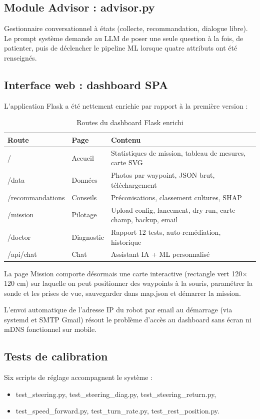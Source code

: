 \documentclass[a4paper,12pt,openany,titlepage]{scrartcl}
\begin{document}
\subsection{Module Advisor : advisor.py}
Gestionnaire conversationnel à états (collecte, recommandation, dialogue libre). Le prompt système demande au LLM de poser une seule question à la fois, de patienter, puis de déclencher le pipeline ML lorsque quatre attributs ont été renseignés.

\subsection{Interface web : dashboard SPA}
L’application Flask a été nettement enrichie par rapport à la première version :

\begin{table}[H]
\centering
\begin{tabular}{|l|l|p{7cm}|}
\hline
\textbf{Route} & \textbf{Page} & \textbf{Contenu} \\
\hline
/ & Accueil & Statistiques de mission, tableau de mesures, carte SVG \\
/data & Données & Photos par waypoint, JSON brut, téléchargement \\
/recommandations & Conseils & Préconisations, classement cultures, SHAP \\
/mission & Pilotage & Upload config, lancement, dry‑run, carte champ, backup, email \\
/doctor & Diagnostic & Rapport 12 tests, auto‑remédiation, historique \\
/api/chat & Chat & Assistant IA + ML personnalisé \\
\hline
\end{tabular}
\caption{Routes du dashboard Flask enrichi}
\end{table}

La page Mission comporte désormais une carte interactive (rectangle vert 120$\times$120 cm) sur laquelle on peut positionner des waypoints à la souris, paramétrer la sonde et les prises de vue, sauvegarder dans map.json et démarrer la mission.

L’envoi automatique de l’adresse IP du robot par email au démarrage (via systemd et SMTP Gmail) résout le problème d’accès au dashboard sans écran ni mDNS fonctionnel sur mobile.

\subsection{Tests de calibration}
Six scripts de réglage accompagnent le système :
\begin{itemize}[nosep]
    \item test\_steering.py, test\_steering\_diag.py, test\_steering\_return.py,
    \item test\_speed\_forward.py, test\_turn\_rate.py, test\_rest\_position.py.
\end{itemize}
\end{document}
